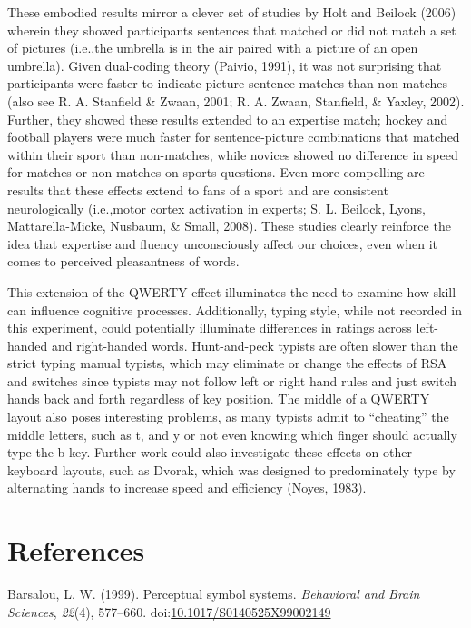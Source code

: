 \documentclass[english,man]{apa6}
\theoremstyle{definition}
\theoremstyle{definition}
\theoremstyle{definition}
\theoremstyle{remark}
\begin{document}
These embodied results mirror a clever set of studies by Holt and
Beilock (2006) wherein they showed participants sentences that matched
or did not match a set of pictures (i.e.,the umbrella is in the air
paired with a picture of an open umbrella). Given dual-coding theory
(Paivio, 1991), it was not surprising that participants were faster to
indicate picture-sentence matches than non-matches (also see R. A.
Stanfield \& Zwaan, 2001; R. A. Zwaan, Stanfield, \& Yaxley, 2002).
Further, they showed these results extended to an expertise match;
hockey and football players were much faster for sentence-picture
combinations that matched within their sport than non-matches, while
novices showed no difference in speed for matches or non-matches on
sports questions. Even more compelling are results that these effects
extend to fans of a sport and are consistent neurologically (i.e.,motor
cortex activation in experts; S. L. Beilock, Lyons, Mattarella-Micke,
Nusbaum, \& Small, 2008). These studies clearly reinforce the idea that
expertise and fluency unconsciously affect our choices, even when it
comes to perceived pleasantness of words.

This extension of the QWERTY effect illuminates the need to examine how
skill can influence cognitive processes. Additionally, typing style,
while not recorded in this experiment, could potentially illuminate
differences in ratings across left-handed and right-handed words.
Hunt-and-peck typists are often slower than the strict typing manual
typists, which may eliminate or change the effects of RSA and switches
since typists may not follow left or right hand rules and just switch
hands back and forth regardless of key position. The middle of a QWERTY
layout also poses interesting problems, as many typists admit to
\enquote{cheating} the middle letters, such as t, and y or not even
knowing which finger should actually type the b key. Further work could
also investigate these effects on other keyboard layouts, such as
Dvorak, which was designed to predominately type by alternating hands to
increase speed and efficiency (Noyes, 1983).

\newpage

\section{References}\label{references}

\setlength{\parindent}{-0.5in} \setlength{\leftskip}{0.5in}

\hypertarget{refs}{}
\hypertarget{ref-Barsalou1999}{}
Barsalou, L. W. (1999). Perceptual symbol systems. \emph{Behavioral and
Brain Sciences}, \emph{22}(4), 577--660.
doi:\href{https://doi.org/10.1017/S0140525X99002149}{10.1017/S0140525X99002149}
\end{document}
